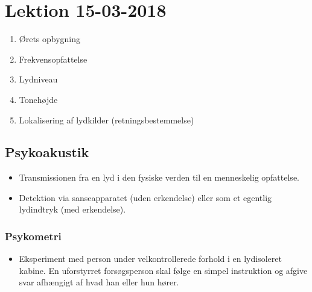 \section{Lektion 15-03-2018}

\begin{enumerate}
	\item Ørets opbygning
	\item Frekvensopfattelse
	\item Lydniveau
	\item Tonehøjde
	\item Lokalisering af lydkilder (retningsbestemmelse)
\end{enumerate}

\noindent{} \vspace{3mm}

\subsection{Psykoakustik}
\begin{itemize}
	\item Transmissionen fra en lyd i den fysiske verden til en menneskelig opfattelse.
	\item Detektion via sanseapparatet (uden erkendelse) eller som et
	egentlig lydindtryk (med erkendelse).
\end{itemize}

\subsubsection{Psykometri}
\begin{itemize}
	\item Eksperiment med person under velkontrollerede forhold i en lydisoleret kabine. En uforstyrret forsøgsperson skal følge en simpel instruktion og afgive svar afhængigt af hvad	han eller hun hører. 
\end{itemize}

